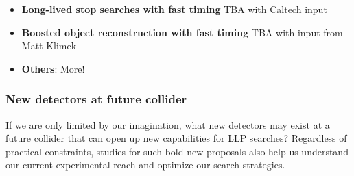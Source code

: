 \begin{itemize}
\item \textbf{Long-lived stop searches with fast timing} 
TBA with Caltech input 

\item \textbf{Boosted object reconstruction with fast timing}
TBA with input from Matt Klimek

\item \textbf{Others}: More!
\end{itemize}

\subsubsection{New detectors at future collider}

If we are only limited by our imagination, what new detectors may exist at a future collider that can open up new capabilities for LLP searches? Regardless of practical constraints, studies for such bold new proposals also help us understand our current experimental reach and optimize our search strategies. 

